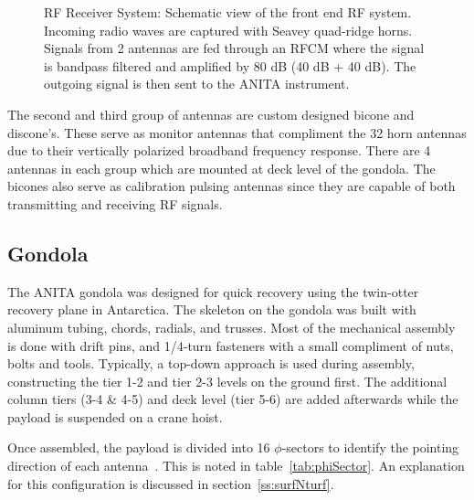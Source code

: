 \begin{figure}[htbp]
\centering
\epsfxsize=4.0in
\caption{RF Receiver System:  Schematic view of the front end RF system.  Incoming radio waves are captured with Seavey quad-ridge horns.  Signals from 2 antennas are fed through an RFCM where the signal is bandpass filtered and amplified by 80 dB (40 dB + 40 dB).  The outgoing signal is then sent to the ANITA instrument.}
\label{fig:RFsystem}
\end{figure}

\par The second and third group of antennas are custom designed bicone and discone's. These serve as monitor antennas that compliment the 32 horn antennas due to their vertically polarized broadband frequency response.  There are 4 antennas in each group which are mounted at deck level of the gondola.  The bicones also serve as calibration pulsing antennas since they are capable of both transmitting and receiving RF signals.

\subsection{Gondola}
\label{ss:Gondola}
The ANITA gondola was designed for quick recovery using the twin-otter recovery plane in Antarctica.  The skeleton on the gondola was built with aluminum tubing, chords, radials, and trusses.  Most of the mechanical assembly is done with drift pins, and 1/4-turn fasteners with a small compliment of nuts, bolts and tools.  Typically, a top-down approach is used during assembly, constructing the tier 1-2 and tier 2-3 levels on the ground first.  The additional column tiers (3-4 \& 4-5) and deck level (tier 5-6) are added afterwards while the payload is suspended on a crane hoist.

\par Once assembled, the payload is divided into 16 $\phi$-sectors to identify the pointing direction of each antenna~\cite{ANITAnote72}.  This is noted in table~\ref{tab:phiSector}.  An explanation for this configuration is discussed in section~\ref{ss:surfNturf}.

